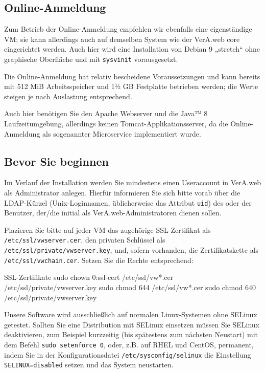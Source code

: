 \documentclass{tarentanleitung}
\begin{document}
\subsection{Online-Anmeldung}\label{subseq:req-oa}

Zum Betrieb der Online-Anmeldung empfehlen wir ebenfalls eine
eigenständige VM; sie kann allerdings auch auf demselben System
wie der VerA.web core eingerichtet werden. Auch hier wird eine
Installation von Debian 9 „stretch“ ohne graphische Oberfläche
und mit \texttt{sysvinit} vorausgesetzt.

Die Online-Anmeldung hat relativ bescheidene Voraussetzungen
und kann bereits mit 512 MiB Arbeitsspeicher und 1½ GB Festplatte
betrieben werden; die Werte steigen je nach Auslastung entsprechend.

Auch hier benötigen Sie den Apache Webserver und die Java™ 8
Laufzeitumgebung, allerdings keinen Tomcat-Applikationsserver, da
die Online-Anmeldung als sogenannter Microservice implementiert wurde.

\subsection{Bevor Sie beginnen}\label{subsec:req-prereq}

Im Verlauf der Installation werden Sie mindestens einen Useraccount
in VerA.web als Administrator anlegen. Hierfür informieren Sie sich
bitte vorab über die LDAP-Kürzel (Unix-Loginnamen, üblicherweise das
Attribut \texttt{uid}) des oder der Benutzer, der/die initial als
VerA.web-Administratoren dienen sollen.

Plazieren Sie bitte auf jeder VM das zugehörige SSL-Zertifikat als
\texttt{/etc/ssl/vwserver.cer}, den privaten Schlüssel als
\texttt{/etc/ssl/private/vwserver.key}, und, sofern vorhanden, die
Zertifikatskette als \texttt{/etc/ssl/vwchain.cer}. Setzen Sie die
Rechte entsprechend:\keinumbruch

\begin{minipage}{\linewidth}
\begin{lstdump}{SSL-Zertifikate}
sudo chown 0:ssl-cert /etc/ssl/vw*.cer /etc/ssl/private/vwserver.key
sudo chmod 644 /etc/ssl/vw*.cer
sudo chmod 640 /etc/ssl/private/vwserver.key
\end{lstdump}
\end{minipage}

Unsere Software wird ausschließlich auf normalen Linux-Systemen ohne
SELinux getestet. Sollten Sie eine Distribution mit SELinux einsetzen
müssen Sie SELinux deaktivieren, zum Beispiel kurzzeitig (bis spätestens
zum nächsten Neustart) mit dem Befehl \texttt{sudo setenforce 0}, oder,
z.B. auf RHEL und CentOS, permanent, indem Sie in der Konfigurationsdatei
\texttt{/etc/sysconfig/selinux} die Einstellung \texttt{SELINUX=disabled}
setzen und das System neustarten.
\end{document}
